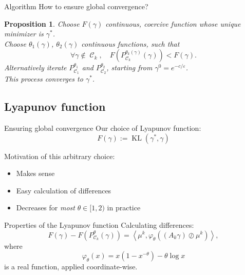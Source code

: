\documentclass[compress]{beamer}
\newcommand{\scal}[2]{\left\langle #1 , #2 \right\rangle}
\DeclareMathOperator{\Ccal}{\mathcal{C}}
\DeclareMathOperator{\KL}{KL}
\renewcommand{\epsilon}{\varepsilon}
\newtheorem{proposition}{Proposition}
\begin{document}
\begin{frame}{Algorithm}
How to ensure global convergence?
\pause
\begin{proposition}
Choose $F(\gamma)$ continuous, coercive function whose unique minimizer is $\gamma^*$.\\
Choose $\theta_1(\gamma)$, $\theta_2(\gamma)$ continuous functions, such that
\begin{equation*}\label{eq:cond_theta_k}
\forall \gamma \notin \Ccal_k,\quad
F(P_{\Ccal_k}^{\theta_k(\gamma)}(\gamma)) < F(\gamma).
\end{equation*}
\pause
Alternatively iterate $P_{\Ccal_1}^{\theta_1}$ and $P_{\Ccal_2}^{\theta_2}$, starting from $\gamma^0 = e^{-c/\epsilon}$.\\
This process converges to $\gamma^*$.
\end{proposition}
\end{frame}

\subsection{Lyapunov function}
\begin{frame}{Ensuring global convergence}
	Our choice of Lyapunov function:
	\[F(\gamma) := \KL(\gamma^*,\gamma)\]
	\pause
	
	Motivation of this arbitrary choice:
	\begin{itemize}
		\item Makes sense
		\item Easy calculation of differences %
		\item Decreases for \emph{most} $\theta \in [1,2)$ in practice %
	\end{itemize}
	
\end{frame}

\begin{frame}{Properties of the Lyapunov function}
Calculating differences:
\begin{equation*} \label{eq:kl_diff_scal}
F(\gamma) - F(P^\theta_{\Ccal_k}(\gamma)) = 
\scal{\mu^k}{\varphi_\theta \left((A_k \gamma) \oslash \mu^k \right)},
\end{equation*}
where
\begin{equation*}
\varphi_\theta(x) = x(1-x^{-\theta}) - \theta \log x
\end{equation*}
is a real function, applied coordinate-wise.
\end{frame}
\end{document}
